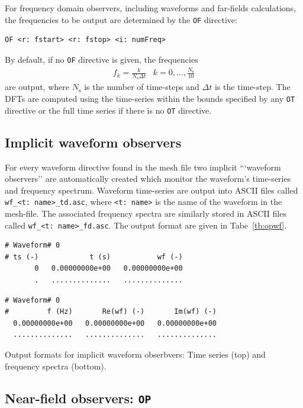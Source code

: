 \documentclass[onecolumn,a4paper]{article}
\numberwithin{equation}{section}
\begin{document}
For frequency domain observers, including waveforms and far-fields calculations, the frequencies to be output
are determined by the \texttt{OF} directive:
\begin{verbatim}
OF <r: fstart> <r: fstop> <i: numFreq>
\end{verbatim}
By default,  if no \texttt{OF} directive is given, the frequencies  
\begin{eqnarray}
f_k  = \frac{k}{N_\mathrm{s}\Delta t}\,\,\,\,\,k=0,\ldots,\frac{N_\mathrm{s}}{10}
\end{eqnarray}
are output, where $N_\mathrm{s}$ is the number of time-steps and $\Delta t$ is the time-step.
The DFTs are computed using the time-series within the bounds specified by any \texttt{OT} directive
or the full time series if there is no \texttt{OT} directive.

\subsection{Implicit waveform observers}
% 

For every waveform directive found in the mesh file two implicit ```waveform observers'' are
automatically created which monitor the waveform's time-series and frequency spectrum. 
Waveform time-series are output into ASCII files called \texttt{wf\_<t:~name>\_td.asc}, where 
\texttt{<t:~name>} is the name of the waveform in the mesh-file. The associated frequency
spectra are similarly stored in ASCII files called \texttt{wf\_<t:~name>\_fd.asc}. The
output format are given in Tabe~\ref{tb:opwf}.

\begin{table}[th]
{\footnotesize
\begin{Verbatim}[frame=single]
# Waveform# 0
# ts (-)            t (s)           wf (-)
       0   0.00000000e+00   0.00000000e+00    
       .   ..............   ..............
\end{Verbatim}
\begin{Verbatim}[frame=single]
# Waveform# 0
#         f (Hz)       Re(wf) (-)       Im(wf) (-)
  0.00000000e+00   0.00000000e+00   0.00000000e+00
  ..............   ..............   ..............
\end{Verbatim}
}
\caption{\label{tb:opwf} Output formats for implicit waveform obserbvers: Time series (top) and frequency spectra (bottom).}
\end{table}

\subsection{Near-field observers: \texttt{OP}}
\end{document}
